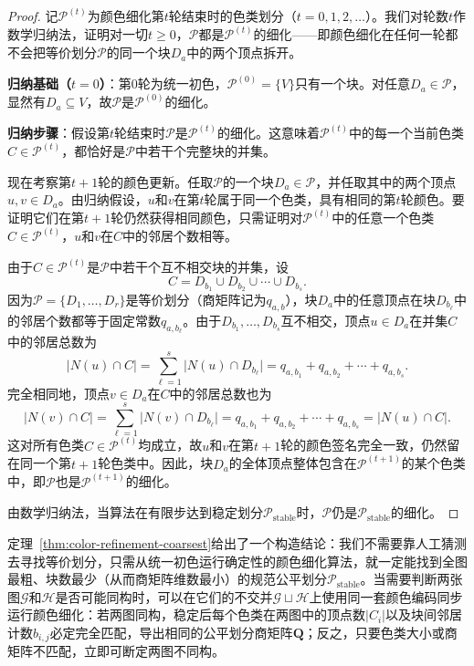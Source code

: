 \begin{proof}
记$\mathcal P^{(t)}$为颜色细化第$t$轮结束时的色类划分（$t=0,1,2,\ldots$）。我们对轮数$t$作数学归纳法，证明对一切$t\geq 0$，$\mathcal P$都是$\mathcal P^{(t)}$的细化——即颜色细化在任何一轮都不会把等价划分$\mathcal P$的同一个块$D_a$中的两个顶点拆开。

\textbf{归纳基础（$t=0$）}：第$0$轮为统一初色，$\mathcal P^{(0)}=\{V\}$只有一个块。对任意$D_a\in\mathcal P$，显然有$D_a\subseteq V$，故$\mathcal P$是$\mathcal P^{(0)}$的细化。

\textbf{归纳步骤}：假设第$t$轮结束时$\mathcal P$是$\mathcal P^{(t)}$的细化。这意味着$\mathcal P^{(t)}$中的每一个当前色类$C\in\mathcal P^{(t)}$，都恰好是$\mathcal P$中若干个完整块的并集。

现在考察第$t+1$轮的颜色更新。任取$\mathcal P$的一个块$D_a\in\mathcal P$，并任取其中的两个顶点$u,v\in D_a$。由归纳假设，$u$和$v$在第$t$轮属于同一个色类，具有相同的第$t$轮颜色。要证明它们在第$t+1$轮仍然获得相同颜色，只需证明对$\mathcal P^{(t)}$中的任意一个色类$C\in\mathcal P^{(t)}$，$u$和$v$在$C$中的邻居个数相等。

由于$C\in\mathcal P^{(t)}$是$\mathcal P$中若干个互不相交块的并集，设
\[
C=D_{b_1}\cup D_{b_2}\cup\cdots\cup D_{b_s}.
\]
因为$\mathcal P=\{D_1,\ldots,D_r\}$是等价划分（商矩阵记为$q_{a,b}$），块$D_a$中的任意顶点在块$D_{b_\ell}$中的邻居个数都等于固定常数$q_{a,b_\ell}$。由于$D_{b_1},\ldots,D_{b_s}$互不相交，顶点$u\in D_a$在并集$C$中的邻居总数为
\[
\bigl|N(u)\cap C\bigr|
=\sum_{\ell=1}^s\bigl|N(u)\cap D_{b_\ell}\bigr|
=q_{a,b_1}+q_{a,b_2}+\cdots+q_{a,b_s}.
\]
完全相同地，顶点$v\in D_a$在$C$中的邻居总数也为
\[
\bigl|N(v)\cap C\bigr|
=\sum_{\ell=1}^s\bigl|N(v)\cap D_{b_\ell}\bigr|
=q_{a,b_1}+q_{a,b_2}+\cdots+q_{a,b_s}
=\bigl|N(u)\cap C\bigr|.
\]
这对所有色类$C\in\mathcal P^{(t)}$均成立，故$u$和$v$在第$t+1$轮的颜色签名完全一致，仍然留在同一个第$t+1$轮色类中。因此，块$D_a$的全体顶点整体包含在$\mathcal P^{(t+1)}$的某个色类中，即$\mathcal P$也是$\mathcal P^{(t+1)}$的细化。

由数学归纳法，当算法在有限步达到稳定划分$\mathcal P_{\mathrm{stable}}$时，$\mathcal P$仍是$\mathcal P_{\mathrm{stable}}$的细化。
\end{proof}

定理~\ref{thm:color-refinement-coarsest}给出了一个构造结论：我们不需要靠人工猜测去寻找等价划分，只需从统一初色运行确定性的颜色细化算法，就一定能找到全图最粗、块数最少（从而商矩阵维数最小）的规范公平划分$\mathcal P_{\mathrm{stable}}$。当需要判断两张图$\mathcal G$和$\mathcal H$是否可能同构时，可以在它们的不交并$\mathcal G\sqcup\mathcal H$上使用同一套颜色编码同步运行颜色细化：若两图同构，稳定后每个色类在两图中的顶点数$|C_i|$以及块间邻居计数$b_{i,j}$必定完全匹配，导出相同的公平划分商矩阵$\bm Q$；反之，只要色类大小或商矩阵不匹配，立即可断定两图不同构。

